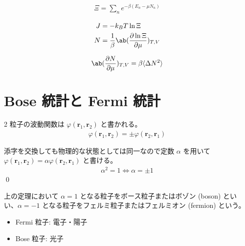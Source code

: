 \documentclass[uplatex,diffipdfmx,a4paper,11pt]{jlreq}
\makeatletter
\newcommand{\rr}{\bm{r}}
\theoremstyle{definition}
\renewenvironment{proof}[1][\proofname]{\par
  \normalfont
  \topsep6\p@\@plus6\p@ \trivlist
  \item[\hskip\labelsep{\bfseries #1}\@addpunct{\bfseries}]\ignorespaces\quad\par
}{%
  \qed\endtrivlist\@endpefalse
}
\renewcommand\proofname{証明}
\makeatother
\begin{document}
\begin{definition}[グランドカノニカル分布]
  \begin{align}
    \Xi = \sum_{n}e^{-\beta(E_n - \mu N_n)}
  \end{align}
\end{definition}

\begin{theorem}
  \begin{align}
    J & = -k_BT\ln\Xi                                   \\
    N & = \frac{1}{\beta}\ab(\diffp{\ln\Xi}{\mu})_{T,V}
  \end{align}
\end{theorem}

\begin{theorem}[粒子数の揺らぎ]
  \begin{align}
    \ab(\diffp{N}{\mu})_{T,V} = \beta\langle\Delta N^2\rangle
  \end{align}
\end{theorem}

\section{Bose 統計と Fermi 統計}
\begin{theorem}
  2 粒子の波動関数は $\varphi(\rr_1, \rr_2)$ と書かれる。
  \begin{align}
    \varphi(\rr_1, \rr_2) = \pm \varphi(\rr_2, \rr_1)
  \end{align}
\end{theorem}
\begin{proof}
  添字を交換しても物理的な状態としては同一なので定数 $\alpha$ を用いて $\varphi(\rr_1, \rr_2) = \alpha\varphi(\rr_2, \rr_1)$ と書ける。
  \begin{align}
    \alpha^2 = 1 \iff \alpha = \pm 1
  \end{align}
\end{proof}

\begin{definition}
  上の定理において $\alpha = 1$ となる粒子をボース粒子またはボゾン (boson) といい、$\alpha = -1$ となる粒子をフェルミ粒子またはフェルミオン (fermion) という。

  \begin{itemize}
    \item Fermi 粒子: 電子・陽子
    \item Bose 粒子: 光子
  \end{itemize}
\end{definition}
\end{document}
